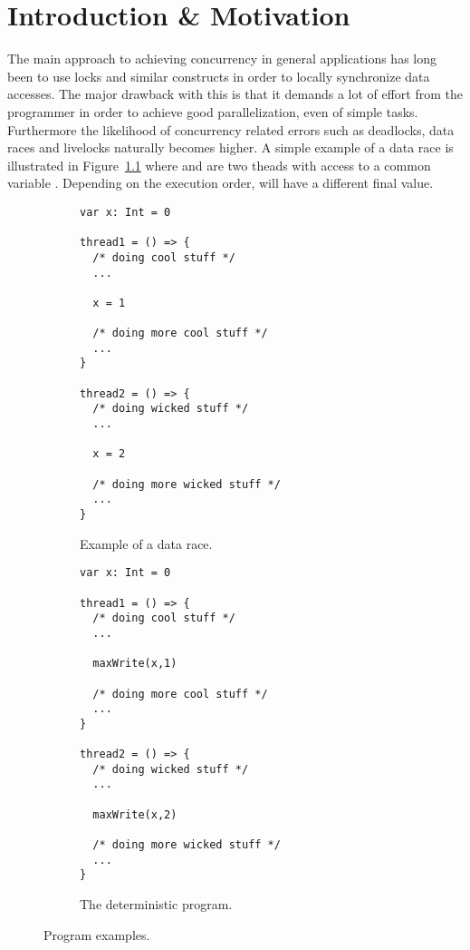 \chapter{Introduction \& Motivation}
\label{cha:introduction}

The main approach to achieving concurrency in general applications has long been
to use locks and similar constructs in order to locally synchronize data
accesses. The major drawback with this is that it demands a lot of effort from
the programmer in order to achieve good parallelization, even of simple tasks.
Furthermore the likelihood of concurrency related errors such as deadlocks, data
races and livelocks naturally becomes higher. A simple example of a data race
is illustrated in Figure~\ref{fig:datarace} where  and
 are two theads with access to a common variable .
Depending on the execution order,  will have a different final value.

\begin{figure}
  \centering
  \begin{subfigure}[t]{0.4\textwidth}
    \begin{lstlisting}[numbers=none,mathescape=true]
var x: Int = 0

thread1 = () => {
  /* doing cool stuff */
  ...

  x = 1
  
  /* doing more cool stuff */
  ...
}

thread2 = () => {
  /* doing wicked stuff */
  ...

  x = 2
  
  /* doing more wicked stuff */
  ...
}
    \end{lstlisting}
    \caption{Example of a data race.}
    \label{fig:datarace}
  \end{subfigure}
  \quad\quad\quad\quad
  \begin{subfigure}[t]{0.4\textwidth}
    \begin{lstlisting}[numbers=none,mathescape=true]
var x: Int = 0

thread1 = () => {
  /* doing cool stuff */
  ...

  maxWrite(x,1)
  
  /* doing more cool stuff */
  ...
}

thread2 = () => {
  /* doing wicked stuff */
  ...

  maxWrite(x,2)
  
  /* doing more wicked stuff */
  ...
}
    \end{lstlisting}
    \caption{The deterministic program.}
    \label{fig:maxwrite}
  \end{subfigure}
  \caption{Program examples.}
\end{figure}


